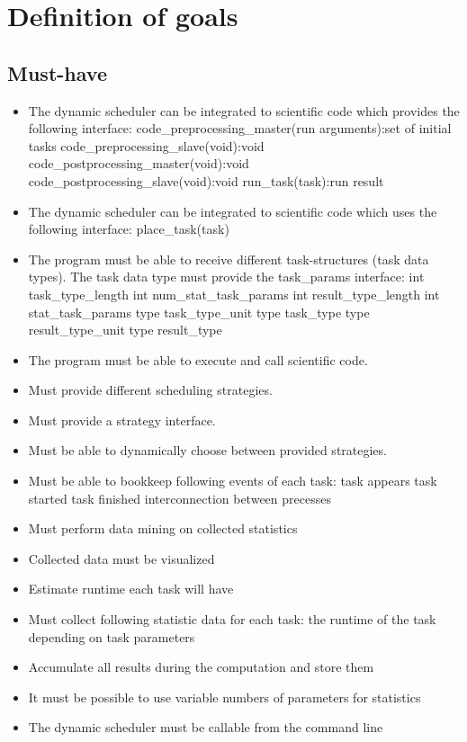 \section{Definition of goals}
	\subsection{Must-have}
		\begin{itemize}
			\item The dynamic scheduler can be integrated to scientific code which provides the following interface:
				\subitem code\_preprocessing\_master(run arguments):set of initial tasks
				\subitem code\_preprocessing\_slave(void):void
				\subitem code\_postprocessing\_master(void):void
				\subitem code\_postprocessing\_slave(void):void
				\subitem run\_task(task):run result
			\item The dynamic scheduler can be integrated to scientific code which uses the following interface:
				\subitem place\_task(task)
			\item The program must be able to receive different task-structures (task data types). The task data type must provide the task\_params interface:
				\subitem int task\_type\_length
				\subitem int num\_stat\_task\_params
				\subitem int result\_type\_length
				\subitem int stat\_task\_params
				\subitem type task\_type\_unit
				\subitem type task\_type
				\subitem type result\_type\_unit
				\subitem type result\_type
				
			\item The program must be able to execute and call scientific code.
			\item Must provide different scheduling strategies.
			\item Must provide a strategy interface.
			\item Must be able to dynamically choose between provided strategies.
			\item Must be able to bookkeep following events of each task:
				\subitem task appears
				\subitem task started
				\subitem task finished
				\subitem interconnection between precesses
			\item Must perform data mining on collected statistics
			\item Collected data must be visualized
			\item Estimate runtime each task will have
			\item Must collect following statistic data for each task:
				\subitem the runtime of the task depending on task parameters
			\item Accumulate all results during the computation and store them
			\item It must be possible to use variable numbers of parameters for statistics
			\item The dynamic scheduler must be callable from the command line
		\end{itemize}
